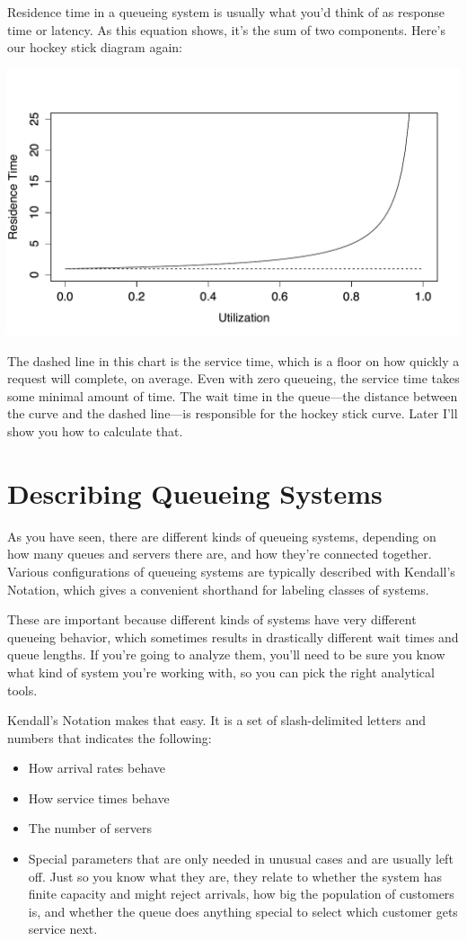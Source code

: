 \documentclass{vivid_layout}
\begin{document}
Residence time in a queueing system is usually what you'd think of as response time or latency. As this equation shows, it's the sum of two components.  Here's our hockey stick diagram again:

\begin{center}
\includegraphics[width=.75\linewidth]{queueing-theory/hockey}
\end{center}

The dashed line in this chart is the service time, which is a floor on how quickly a request will complete, on average. Even with zero queueing, the service time takes some minimal amount of time. The wait time in the queue---the distance between the curve and the dashed line---is responsible for the hockey stick curve. Later I'll show you how to calculate that.

\section{Describing Queueing Systems}

As you have seen, there are different kinds of queueing systems, depending on how many queues and servers there are, and how they're connected together. Various configurations of queueing systems are typically described with Kendall's Notation, which gives a convenient shorthand for labeling classes of systems.

These are important because different kinds of systems have very different queueing behavior, which sometimes results in drastically different wait times and queue lengths. If you're going to analyze them, you'll need to be sure you know what kind of system you're working with, so you can pick the right analytical tools.

Kendall's Notation makes that easy. It is a set of slash-delimited letters and numbers that indicates the following:

\begin{itemize}
\item How arrival rates behave
\item How service times behave
\item The number of servers
\item Special parameters that are only needed in unusual cases and are usually left off. Just so you know what they are, they relate to whether the system has finite capacity and might reject arrivals, how big the population of customers is, and whether the queue does anything special to select which customer gets service next.
\end{itemize}
\end{document}
